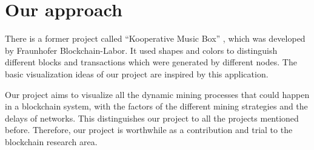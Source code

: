 \section{Our approach}

There is a former project called “Kooperative Music Box” \cite{musicbox}, which was developed by Fraunhofer Blockchain-Labor. It used shapes and colors to distinguish different blocks and transactions which were generated by different nodes. The basic visualization ideas of our project are inspired by this application.

Our project aims to visualize all the dynamic mining processes that could happen in a blockchain system, with the factors of the different mining strategies and the delays of networks. This distinguishes our project to all the projects mentioned before. Therefore, our project is worthwhile as a contribution and trial to the blockchain research area.
